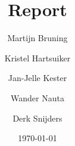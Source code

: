 \documentclass[twoside,openright]{report}
\title{Report}
\author{
     Martijn Bruning
\and Kristel Hartsuiker
\and Jan-Jelle Kester
\and Wander Nauta
\and Derk Snijders
}
\date{\today}
\begin{document}
\renewcommand*\rmdefault{ppl}
\renewcommand*\sfdefault{ppl}

\begin{titlepage}
	{\Huge \thetitle} \\
	\vfill
	\theauthor \\
	\thedate
\end{titlepage}

\tableofcontents
























\printindex

\printglossaries
\end{document}
